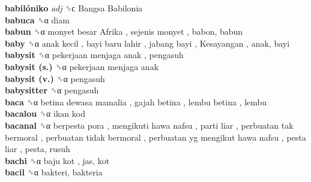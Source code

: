 \textbf{babilóniko} \emph{adj}  ␝ϲ   Bangsa Babilonia   \\
\textbf{babuca} ␝α  diam  \\
\textbf{babun} ␝α   monyet besar Afrika ,  sejenis monyet , babon, babun  \\
\textbf{baby} ␝α   anak kecil ,  bayi baru lahir ,  jabang bayi ,  Kesayangan , anak, bayi  \\
\textbf{babysit} ␝α   pekerjaan menjaga anak , pengasuh  \\
\textbf{babysit (s.)} ␝α   pekerjaan menjaga anak   \\
\textbf{babysit (v.)} ␝α  pengasuh  \\
\textbf{babysitter} ␝α  pengasuh  \\
\textbf{baca} ␝α   betina dewasa mamalia ,  gajah betina ,  lembu betina , lembu  \\
\textbf{bacalou} ␝α   ikan kod   \\
\textbf{bacanal} ␝α   berpesta pora ,  mengikuti hawa nafsu ,  parti liar ,  perbuatan tak bermoral ,  perbuatan tidak bermoral ,  perbuatan yg mengikut hawa nafsu ,  pesta liar , pesta, rusuh  \\
\textbf{bachi} ␝α   baju kot , jas, kot  \\
\textbf{bacil} ␝α  bakteri, bakteria  \\
